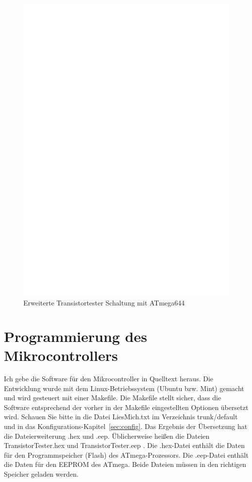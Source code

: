\begin{figure}[H]
\centering
\includegraphics[width=18cm]{../FIG/t644tester.eps}
\caption{Erweiterte Transistortester Schaltung mit ATmega644}
\label{fig:t644tester}
\end{figure}

\section{Programmierung des Mikrocontrollers}
Ich gebe die Software für den Mikrocontroller in Quelltext heraus.
Die Entwicklung wurde mit dem Linux-Betriebssystem (Ubuntu bzw. Mint) gemacht
und wird gesteuert mit einer Makefile.
Die Makefile stellt sicher, dass die Software entsprechend der vorher in der Makefile 
eingestellten Optionen übersetzt wird. Schauen Sie bitte in die Datei LiesMich.txt
im Verzeichnis trunk/default und in das Konfigurations-Kapitel~\ref{sec:config}.
Das Ergebnis der Übersetzung hat die Dateierweiterung .hex und .eep.
Üblicherweise heißen die Dateien TransistorTester.hex und TransistorTester.eep .
Die .hex-Datei enthält die Daten für den Programmspeicher (Flash) des ATmega-Prozessors.
Die .eep-Datei enthält die Daten für den EEPROM des ATmega.
Beide Dateien müssen in den richtigen Speicher geladen werden.

